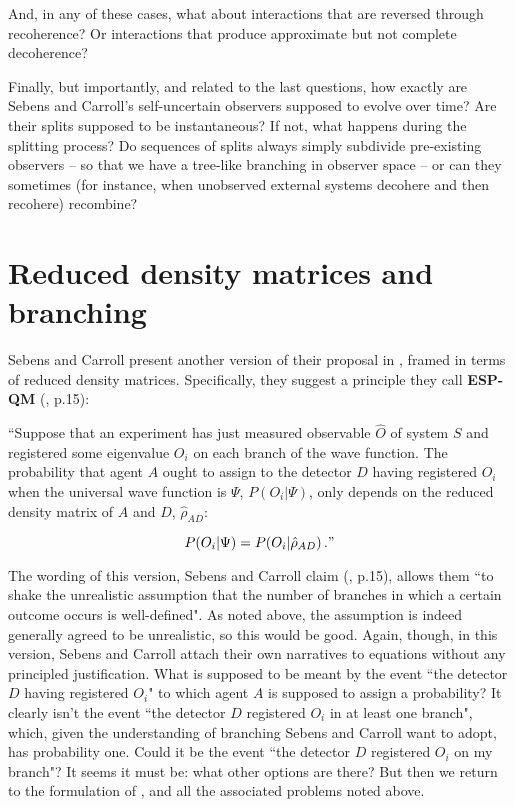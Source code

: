 \documentclass[aps,prl,12pt]{revtex4}
\begin{document}
And, in any of these cases, what about interactions that are
reversed through recoherence?   Or interactions
that produce approximate but not complete decoherence?  

Finally, but importantly, and related to the last questions,
how exactly are Sebens and Carroll's
self-uncertain observers supposed to evolve over time?   
Are their splits supposed to be instantaneous?   If not,
what happens during the splitting process?   Do sequences
of splits always simply subdivide pre-existing observers --
so that we have a tree-like branching in observer space --
or can they sometimes (for instance, when unobserved external
systems decohere and then recohere) recombine?   


\section{Reduced density matrices and branching}

Sebens and Carroll present another version of their proposal
in \cite{cs1}, framed in terms of reduced density matrices.
Specifically, they suggest a principle they call {\bf ESP-QM}
(\cite{cs1}, p.15):

``Suppose that an experiment has just measured observable
$\hat{O}$ of system $S$ and registered some eigenvalue
$O_i$ on each branch of the wave function.  The probability
that agent $A$ ought to assign to the detector $D$ having
registered $O_i$ when the universal wave function is
$\Psi$, $P ( O_i | \Psi )$, only depends on the reduced density
matrix of $A$ and $D$, $\hat{\rho}_{AD}$:

\begin{equation}
P( O_i | \Psi ) = P( O_i | \hat{\rho}_{AD} ) \, ." 
\end{equation}

The wording of this version, Sebens and Carroll claim (\cite{cs1},
p.15), allows them ``to shake the unrealistic assumption that the number
of branches in which a certain outcome occurs is well-defined". 
As noted above, the assumption is indeed generally agreed to be 
unrealistic, so this would be good.    Again, though, in this
version, Sebens and Carroll attach their own narratives 
to equations without any principled justification. 
What is supposed to be meant by
the event ``the detector $D$ having registered $O_i$" to
which agent $A$ is supposed to assign a probability? 
It clearly isn't the event ``the detector $D$ registered $O_i$ in
at least one branch", which, given the understanding of branching 
Sebens and Carroll want to adopt, has probability one.  
Could it be the event ``the detector $D$ registered $O_i$ on
my branch"?  It seems it must be: what other options are
there?   But then we return to the formulation of 
\cite{cs2}, and all the associated problems noted above.  
\end{document}
